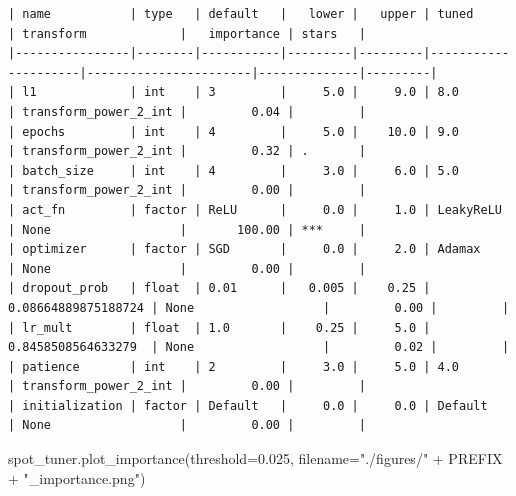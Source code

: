 \documentclass[
  letterpaper,
  DIV=11,
  numbers=noendperiod]{scrreprt}
\newenvironment{Shaded}{\begin{snugshade}}{\end{snugshade}}
\newcommand{\FloatTok}[1]{\textcolor[rgb]{0.68,0.00,0.00}{#1}}
\newcommand{\NormalTok}[1]{\textcolor[rgb]{0.00,0.23,0.31}{#1}}
\newcommand{\OperatorTok}[1]{\textcolor[rgb]{0.37,0.37,0.37}{#1}}
\newcommand{\StringTok}[1]{\textcolor[rgb]{0.13,0.47,0.30}{#1}}
\begin{document}
\begin{verbatim}
| name           | type   | default   |   lower |   upper | tuned               | transform             |   importance | stars   |
|----------------|--------|-----------|---------|---------|---------------------|-----------------------|--------------|---------|
| l1             | int    | 3         |     5.0 |     9.0 | 8.0                 | transform_power_2_int |         0.04 |         |
| epochs         | int    | 4         |     5.0 |    10.0 | 9.0                 | transform_power_2_int |         0.32 | .       |
| batch_size     | int    | 4         |     3.0 |     6.0 | 5.0                 | transform_power_2_int |         0.00 |         |
| act_fn         | factor | ReLU      |     0.0 |     1.0 | LeakyReLU           | None                  |       100.00 | ***     |
| optimizer      | factor | SGD       |     0.0 |     2.0 | Adamax              | None                  |         0.00 |         |
| dropout_prob   | float  | 0.01      |   0.005 |    0.25 | 0.08664889875188724 | None                  |         0.00 |         |
| lr_mult        | float  | 1.0       |    0.25 |     5.0 | 0.8458508564633279  | None                  |         0.02 |         |
| patience       | int    | 2         |     3.0 |     5.0 | 4.0                 | transform_power_2_int |         0.00 |         |
| initialization | factor | Default   |     0.0 |     0.0 | Default             | None                  |         0.00 |         |
\end{verbatim}

\begin{Shaded}
\begin{Highlighting}[]
\NormalTok{spot\_tuner.plot\_importance(threshold}\OperatorTok{=}\FloatTok{0.025}\NormalTok{,}
\NormalTok{    filename}\OperatorTok{=}\StringTok{"./figures/"} \OperatorTok{+}\NormalTok{ PREFIX }\OperatorTok{+} \StringTok{"\_importance.png"}\NormalTok{)}
\end{Highlighting}
\end{Shaded}
\end{document}
